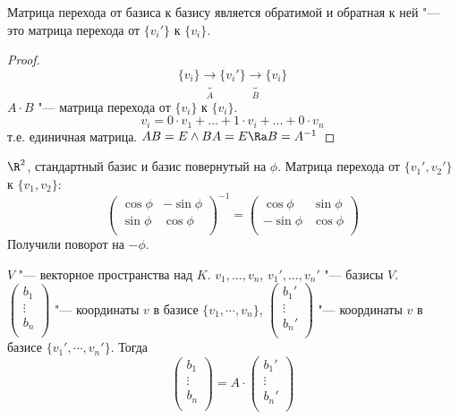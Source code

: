 \begin{conseq}
	Матрица перехода от базиса к базису является обратимой и обратная к ней
	"--- это матрица перехода от $\{v_i'\}$ к $\{v_i\}$.
\end{conseq}
\begin{proof}
	\[ \{v_i\} \underbrace{\to}_{A} \{v_i'\} \underbrace {\to}_{B} \{v_i\} \]
	$A \cdot B$ "--- матрица перехода от $\{v_i\}$ к $\{v_i\}$.
	\[ v_i = 0\cdot v_1 + \dots + 1\cdot v_i + \dots + 0\cdot v_n \]
	т.е. единичная матрица.
	$AB = E \land BA = E \Ra B = A^{-1}$
\end{proof}

\begin{exmp}
	$\R^2$, стандартный базис и базис повернутый на $\phi$.
	Матрица перехода от $\{v_1', v_2'\}$ к $\{v_1, v_2\}$:
	\[
		\begin{pmatrix}
			\cos \phi & -\sin \phi\\
			\sin \phi & \cos \phi\\
		\end{pmatrix}^{-1}
		=
		\begin{pmatrix}
			\cos \phi & \sin \phi\\
			-\sin \phi & \cos \phi\\
		\end{pmatrix}
	\]
	Получили поворот на $-\phi$.
\end{exmp}

\begin{theorem}
	$V$ "--- векторное пространства над $K$.
	$v_1, \dots, v_n$, $v_1', \dots, v_n'$ "--- базисы $V$. \\
	$
		\begin{pmatrix}
			b_1\\
			\vdots\\
			b_n\\
		\end{pmatrix}
	$ "--- координаты $v$ в базисе $\{v_1, \cdots, v_n\}$,
	$
		\begin{pmatrix}
			b_1'\\
			\vdots\\
			b_n'\\
		\end{pmatrix}
	$ "--- координаты $v$ в базисе $\{v_1', \cdots, v_n'\}$.
	Тогда
	\[
		\begin{pmatrix}
			b_1\\
			\vdots\\
			b_n\\
		\end{pmatrix}
		= A \cdot
		\begin{pmatrix}
			b_1'\\
			\vdots\\
			b_n'\\
		\end{pmatrix}
	\]
\end{theorem}


